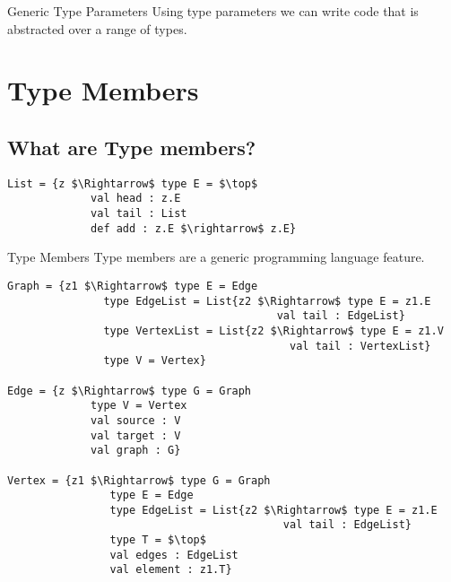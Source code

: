 \documentclass[dvipsnames]{beamer}
\begin{document}
\begin{frame}{Generic Type Parameters}
Using type parameters we can write code that is abstracted over a range of types.
\begin{example}
\usebox{\tpExList}
\end{example}
\end{frame}

\section{Type Members}

\subsection{What are Type members?}

\begin{lrbox}{\tmExList}
\begin{lstlisting}[mathescape, style=customlang]
List = {z $\Rightarrow$ type E = $\top$
             val head : z.E
             val tail : List
             def add : z.E $\rightarrow$ z.E}
\end{lstlisting}
\end{lrbox}

\begin{frame}{Type Members}
Type members are a generic programming language feature.
\begin{example}
\usebox{\tmExList}
\end{example}
\end{frame}

\begin{lrbox}{\tmExA}
\begin{lstlisting}[mathescape, style=customlang]
Graph = {z1 $\Rightarrow$ type E = Edge
               type EdgeList = List{z2 $\Rightarrow$ type E = z1.E 
                                          val tail : EdgeList}
               type VertexList = List{z2 $\Rightarrow$ type E = z1.V
                                            val tail : VertexList}
               type V = Vertex}

Edge = {z $\Rightarrow$ type G = Graph
             type V = Vertex
             val source : V
             val target : V
             val graph : G}
             
Vertex = {z1 $\Rightarrow$ type G = Graph
                type E = Edge
                type EdgeList = List{z2 $\Rightarrow$ type E = z1.E
                                           val tail : EdgeList}
                type T = $\top$
                val edges : EdgeList
                val element : z1.T}
\end{lstlisting}
\end{lrbox}
\end{document}
